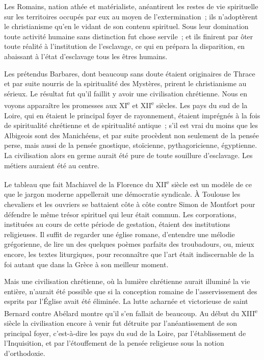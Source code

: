 \documentclass[french,twoside]{book} %
\begin{document}
Les Romains, nation athée et matérialiste, anéantirent les restes de vie spirituelle sur les territoires occupés par eux au moyen de l'extermination ; ils n'adoptèrent le christianisme qu'en le vidant de son contenu spirituel. Sous leur domination toute activité humaine sans distinction fut chose servile ; et ils finirent par ôter toute réalité à l'institution de l'esclavage, ce qui en prépara la disparition, en abaissant à l'état d'esclavage tous les êtres humains.\par
Les prétendus Barbares, dont beaucoup sans doute étaient originaires de Thrace et par suite nourris de la spiritualité des Mystères, prirent le christianisme au sérieux. Le résultat fut qu'il faillit y avoir une civilisation chrétienne. Nous en voyons apparaître les promesses aux XI\textsuperscript{e} et XII\textsuperscript{e} siècles. Les pays du sud de la Loire, qui en étaient le principal foyer de rayonnement, étaient imprégnés à la fois de spiritualité chrétienne et de spiritualité antique ; s'il est vrai du moins que les Albigeois sont des Manichéens, et par suite procèdent non seulement de la pensée perse, mais aussi de la pensée gnostique, stoïcienne, pythagoricienne, égyptienne. La civilisation alors en germe aurait été pure de toute souillure d'esclavage. Les métiers auraient été au centre.\par
Le tableau que fait Machiavel de la Florence du XII\textsuperscript{e} siècle est un modèle de ce que le jargon moderne appellerait une démocratie syndicale. À Toulouse les chevaliers et les ouvriers se battaient côte à côte contre Simon de Montfort pour défendre le même trésor spirituel qui leur était commun. Les corporations, instituées au cours de cette période de gestation, étaient des institutions religieuses. Il suffit de regarder une église romane, d'entendre une mélodie grégorienne, de lire un des quelques poèmes parfaits des troubadours, ou, mieux encore, les textes liturgiques, pour reconnaître que l'art était indiscernable de la foi autant que dans la Grèce à son meilleur moment.\par
Mais une civilisation chrétienne, où la lumière chrétienne aurait illuminé la vie entière, n'aurait été possible que si la conception romaine de l’asservissement des esprits par l'Église avait été éliminée. La lutte acharnée et victorieuse de saint Bernard contre Abélard montre qu'il s'en fallait de beaucoup. Au début du XIII\textsuperscript{e} siècle la civilisation encore à venir fut détruite par l'anéantissement de son principal foyer, c'est-à-dire les pays du sud de la Loire, par l'établissement de l'Inquisition, et par l'étouffement de la pensée religieuse sous la notion d'orthodoxie.\par
\end{document}
